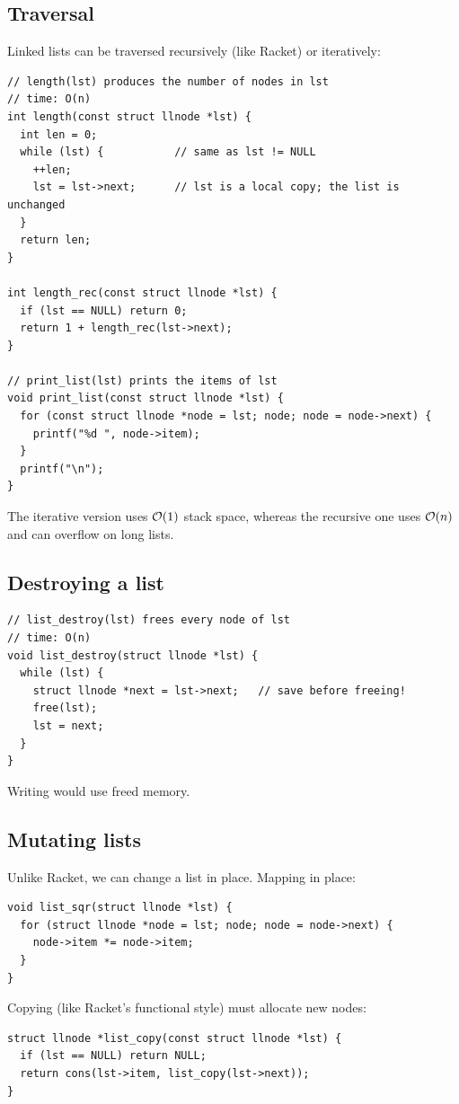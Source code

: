 \subsection{Traversal}

Linked lists can be traversed recursively (like Racket) or iteratively:
\begin{lstlisting}[style=c]
// length(lst) produces the number of nodes in lst
// time: O(n)
int length(const struct llnode *lst) {
  int len = 0;
  while (lst) {           // same as lst != NULL
    ++len;
    lst = lst->next;      // lst is a local copy; the list is unchanged
  }
  return len;
}

int length_rec(const struct llnode *lst) {
  if (lst == NULL) return 0;
  return 1 + length_rec(lst->next);
}

// print_list(lst) prints the items of lst
void print_list(const struct llnode *lst) {
  for (const struct llnode *node = lst; node; node = node->next) {
    printf("%d ", node->item);
  }
  printf("\n");
}
\end{lstlisting}
The iterative version uses $\mathcal{O}(1)$ stack space, whereas the recursive one uses $\mathcal{O}(n)$ and
can overflow on long lists.

\subsection{Destroying a list}
\begin{lstlisting}[style=c]
// list_destroy(lst) frees every node of lst
// time: O(n)
void list_destroy(struct llnode *lst) {
  while (lst) {
    struct llnode *next = lst->next;   // save before freeing!
    free(lst);
    lst = next;
  }
}
\end{lstlisting}
Writing  would use freed memory.

\subsection{Mutating lists}

Unlike Racket, we can change a list in place. Mapping in place:
\begin{lstlisting}[style=c]
void list_sqr(struct llnode *lst) {
  for (struct llnode *node = lst; node; node = node->next) {
    node->item *= node->item;
  }
}
\end{lstlisting}
Copying (like Racket's functional style) must allocate new nodes:
\begin{lstlisting}[style=c]
struct llnode *list_copy(const struct llnode *lst) {
  if (lst == NULL) return NULL;
  return cons(lst->item, list_copy(lst->next));
}
\end{lstlisting}

